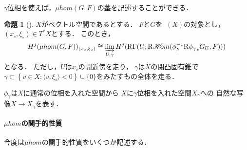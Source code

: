 \documentclass[leqno, 10pt, a4paper, dvipdfmx]{jsarticle}
\theoremstyle{definition}
\numberwithin{equation}{section}
\newcommand{\Dompb}{\mathop{\mathsf{D}^\mathrm{b}}\nolimits}
\newcommand{\HOM}{\mathop{\mathscr{H}\hspace{-2pt}om}\nolimits}%
\newcommand{\RHOM}{\mathop{\mathrm{R}\hspace{-1.5pt}\HOM}\nolimits}
\newcommand{\RG}{\mathop{\mathrm{R}\hspace{-0pt}\Gamma}\nolimits}
\newcommand{\Rder}{\mathrm{R}}
\newcommand{\indlim}[1][]{\mathop{\varinjlim}\limits_{#1}}
\theoremstyle{mystyle}
\newtheorem{PRP}[AXM]{命題}
\renewenvironment{leftbar}{%
  \def\FrameCommand{\textcolor{lightgray}{\vrule width 4pt} \hspace{10pt}}%
  \MakeFramed {\advance\hsize-\width \FrameRestore}}%
{\endMakeFramed}
\def\inner<#1>{\langle #1 \rangle}
\newcommand{\cotb}[1][]{T^{\ast}{#1}}
\newcommand{\muhom}{\mu hom}
\begin{document}
\(\gamma\)位相を使えば，\(\muhom(G,F)\)の茎を記述することができる．

\begin{leftbar}
\begin{PRP}[{\cite[Prop.4.4.4]{KS90}}]\label{prp4.4.4}
  \(X\)がベクトル空間であるとする．
  \(F\)と\(G\)を\(\Dompb(X)\)の対象とし，\((x_{\circ},\xi_{\circ})\in\cotb[X]\)とする．
  このとき，
  \[
    H^{j}(\muhom(G,F))_{(x_{\circ},\xi_{\circ})}
    \cong
    \indlim[U,\gamma]H^{j}(\RG(U;\RHOM(\phi_{\gamma}^{-1}\Rder{{\phi_{\gamma}}_{\ast}}G_{U},F)))
  \]
  となる．
  ただし，\(U\)は\(x_{\circ}\)の開近傍を走り，
  \(\gamma\)は\(X\)の閉凸固有錐で\(
    \gamma\subset\left\{
      v\in X;\inner<v,\xi_{\circ}><0
    \right\}\cup\{0\}
  \)をみたすもの全体を走る．
\end{PRP}
\end{leftbar}

\(\phi_{\gamma}\)は\(X\)に通常の位相を入れた空間から
\(X\)に\(\gamma\)位相を入れた空間\(X_{\gamma}\)への
自然な写像\(X\to X_{\gamma}\)を表す．

\clearpage
\paragraph{ \(\muhom\)の関手的性質}

今度は\(\muhom\)の関手的性質をいくつか記述する．
\end{document}
